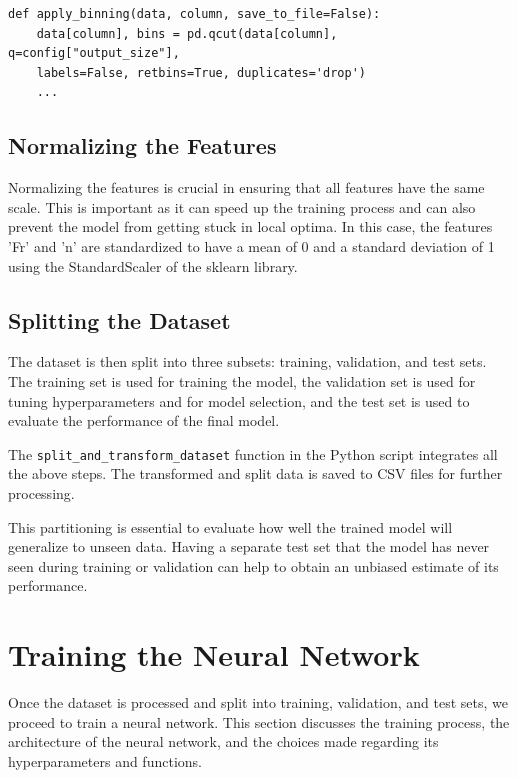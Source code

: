 \begin{verbatim}
def apply_binning(data, column, save_to_file=False):
    data[column], bins = pd.qcut(data[column], q=config["output_size"],
    labels=False, retbins=True, duplicates='drop')
    ...
\end{verbatim}

\subsection*{Normalizing the Features}

Normalizing the features is crucial in ensuring that all features have the same scale. This is important as it can speed up the training process and can also prevent the model from getting stuck in local optima. In this case, the features 'Fr' and 'n' are standardized to have a mean of 0 and a standard deviation of 1 using the StandardScaler of the sklearn library.

\subsection*{Splitting the Dataset}

The dataset is then split into three subsets: training, validation, and test sets. The training set is used for training the model, the validation set is used for tuning hyperparameters and for model selection, and the test set is used to evaluate the performance of the final model.

The \texttt{split\_and\_transform\_dataset} function in the Python script integrates all the above steps. The transformed and split data is saved to CSV files for further processing.

This partitioning is essential to evaluate how well the trained model will generalize to unseen data. Having a separate test set that the model has never seen during training or validation can help to obtain an unbiased estimate of its performance.


\section{Training the Neural Network}

Once the dataset is processed and split into training, validation, and test sets, we proceed to train a neural network. This section discusses the training process, the architecture of the neural network, and the choices made regarding its hyperparameters and functions.

